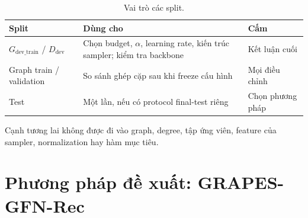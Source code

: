 \documentclass[11pt,a4paper]{article}
\begin{document}
\begin{table}[h]
\centering\small
\caption{Vai trò các split.}\label{tab:splits}
\begin{tabularx}{\linewidth}{lYY}
\toprule
Split & Dùng cho & Cấm \\
\midrule
$G_{\text{dev\_train}}$ / $D_{\text{dev}}$ & Chọn budget, $\alpha$, learning rate, kiến trúc sampler; kiểm tra backbone & Kết luận cuối \\
Graph train / validation & So sánh ghép cặp sau khi freeze cấu hình & Mọi điều chỉnh \\
Test & Một lần, nếu có protocol final-test riêng & Chọn phương pháp \\
\bottomrule
\end{tabularx}
\end{table}

Cạnh tương lai không được đi vào graph, degree, tập ứng viên, feature của sampler, normalization hay hàm mục tiêu.

\section{Phương pháp đề xuất: GRAPES-GFN-Rec}
\end{document}
